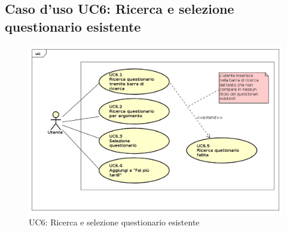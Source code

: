 \subsection{Caso d'uso UC6: Ricerca e selezione questionario esistente}
\label{UC6}
\begin{figure}[h]
\centering
\includegraphics[scale=0.5,keepaspectratio]{UML/UC6.png}
\caption{UC6: Ricerca e selezione questionario esistente}
\end{figure}
\FloatBarrier
